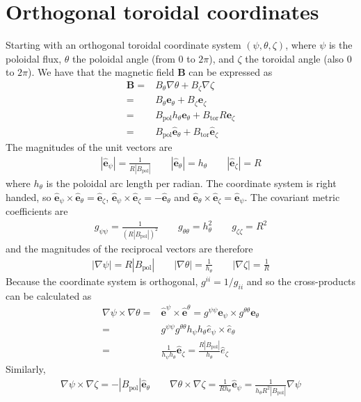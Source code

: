 \documentclass[12pt]{article}
\def\L{\left}
\def\R{\right}
\newcommand{\hthe}{\ensuremath{h_\theta}}
\newcommand{\Bp}{\ensuremath{B_{\text{pol}}}}
\newcommand{\Bt}{\ensuremath{B_{\text{tor}}}}
\newcommand{\ve}[1]{\ensuremath{\boldsymbol{#1}}}
\newcommand{\hv}[1]{\hat{\ve{#1}}}
\newcommand{\Bvec}{\ve{B}}
\begin{document}
\section{Orthogonal toroidal coordinates}
%
\label{sec:coordinates}
Starting with an orthogonal toroidal coordinate system $\L(\psi, \theta,
\zeta\R)$, where $\psi$ is the poloidal flux, $\theta$ the poloidal angle (from
$0$ to $2\pi$), and $\zeta$ the toroidal angle (also $0$ to $2\pi$). We have
that the magnetic field $\Bvec$ can be expressed as
%
\begin{align*}
 \Bvec =& B_\theta \nabla \theta + B_\zeta \nabla \zeta\\ =& B_\theta
    \ve{e}_\theta + B_\zeta \ve{e}_\zeta\\ =& \Bp h_\theta \ve{e}_\theta + \Bt
    R \ve{e}_\zeta\\ =& \Bp \hv{e}_\theta + \Bt \hv{e}_\zeta
\end{align*}
%
The magnitudes of the unit vectors are
%
\begin{align*}
\L|\hv{e}_\psi\R| = \frac{1}{R\L|\Bp\R|} \qquad \L|\hv{e}_\theta\R| = \hthe
\qquad \L|\hv{e}_\zeta\R| = R
\end{align*}
%
where $\hthe$ is the poloidal arc length per radian.  The coordinate system is
right handed, so $\hv{e}_\psi\times\hv{e}_\theta = \hv{e}_\zeta$,
$\hv{e}_\psi\times\hv{e}_\zeta = -\hv{e}_\theta$ and
$\hv{e}_\theta\times\hv{e}_\zeta = \hv{e}_\psi$. The covariant metric
coefficients are
%
\begin{align*}
g_{\psi\psi} = \frac{1}{\L(R\L|\Bp\R|\R)^2} \qquad g_{\theta\theta} =
h_\theta^2 \qquad g_{\zeta\zeta} = R^2
\end{align*}
%
and the magnitudes of the reciprocal vectors are therefore
%
\begin{align*}
\L|\nabla\psi\R| = R\L|\Bp\R| \qquad \L|\nabla\theta\R| = \frac{1}{h_\theta}
\qquad \L|\nabla\zeta\R| = \frac{1}{R}
\end{align*}
%
Because the coordinate system is orthogonal, $g^{ii} = 1/g_{ii}$ and so the
cross-products can be calculated as
%
\begin{align*}
\nabla\psi\times\nabla\theta = &\hv{e}^\psi\times \hv{e}^\theta =
    g^{\psi\psi}\ve{e}_\psi\times g^{\theta\theta}\ve{e}_\theta \nonumber \\ =
    & g^{\psi\psi}g^{\theta\theta}h_\psi h_\theta
    \hat{e}_\psi\times\hat{e}_\theta \nonumber \\ = &\frac{1}{h_\psi
h_\theta}\hv{e}_\zeta = \frac{R\L|\Bp\R|}{h_\theta}\hat{e}_\zeta
\end{align*}
%
Similarly,
%
\begin{align*}
\nabla\psi\times\nabla\zeta = -\L|\Bp\R|\hv{e}_\theta \qquad
\nabla\theta\times\nabla\zeta = \frac{1}{Rh_\theta}\hv{e}_\psi =
\frac{1}{h_\theta R^2\L|\Bp\R|}\nabla \psi
\end{align*}
%
\end{document}
